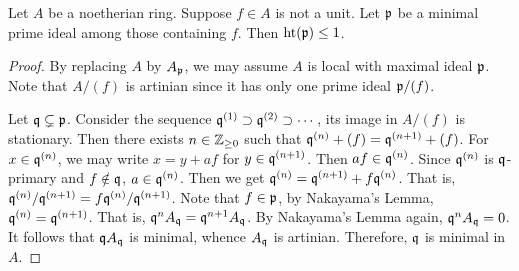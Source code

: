 

    \begin{theorem}\label{thm: Krull's principal ideal theorem}
        Let $A$ be a noetherian ring.
        Suppose $f \in A$ is not a unit.
        Let ${\mathfrak{p}}$ be a minimal prime ideal among those containing $f$.
        Then $\operatorname{ht}({\mathfrak{p}})\leq 1$.
    \end{theorem}
    \begin{proof}
        By replacing $A$ by $A_{\mathfrak{p}}$, we may assume $A$ is local with maximal ideal ${\mathfrak{p}}$.
        Note that $A/(f)$ is artinian since it has only one prime ideal ${\mathfrak{p}}/(f)$.

        Let ${\mathfrak{q}} \subsetneq {\mathfrak{p}}$.
        Consider the sequence ${\mathfrak{q}}^{(1)} \supset {\mathfrak{q}}^{(2)} \supset \cdots$, its image in $A/(f)$ is stationary.
        Then there exists $n \in {\mathbb{Z}}_{\geq 0}$ such that ${\mathfrak{q}}^{(n)} + (f) = {\mathfrak{q}}^{(n+1)} +(f)$.
        For $x \in {\mathfrak{q}}^{(n)}$, we may write $x = y + af$ for $y \in {\mathfrak{q}}^{(n+1)}$.
        Then $af \in {\mathfrak{q}}^{(n)}$.
        Since ${\mathfrak{q}}^{(n)}$ is ${\mathfrak{q}}$-primary and $f \notin {\mathfrak{q}}$, $a \in {\mathfrak{q}}^{(n)}$.
        Then we get ${\mathfrak{q}}^{(n)} = {\mathfrak{q}}^{(n+1)} + f {\mathfrak{q}}^{(n)}$.
        That is, ${\mathfrak{q}}^{(n)}/{\mathfrak{q}}^{(n+1)} = f {\mathfrak{q}}^{(n)}/{\mathfrak{q}}^{(n+1)}$.
        Note that $f \in {\mathfrak{p}}$, by Nakayama's Lemma, ${\mathfrak{q}}^{(n)} = {\mathfrak{q}}^{(n+1)}$.
        That is, ${\mathfrak{q}}^n A_{\mathfrak{q}} = {\mathfrak{q}}^{n+1} A_{\mathfrak{q}}$.
        By Nakayama's Lemma again, ${\mathfrak{q}}^n A_{\mathfrak{q}} = 0$.
        It follows that ${\mathfrak{q}} A_{\mathfrak{q}}$ is minimal, whence $A_{\mathfrak{q}}$ is artinian.
        Therefore, ${\mathfrak{q}}$ is minimal in $A$.
    \end{proof}

